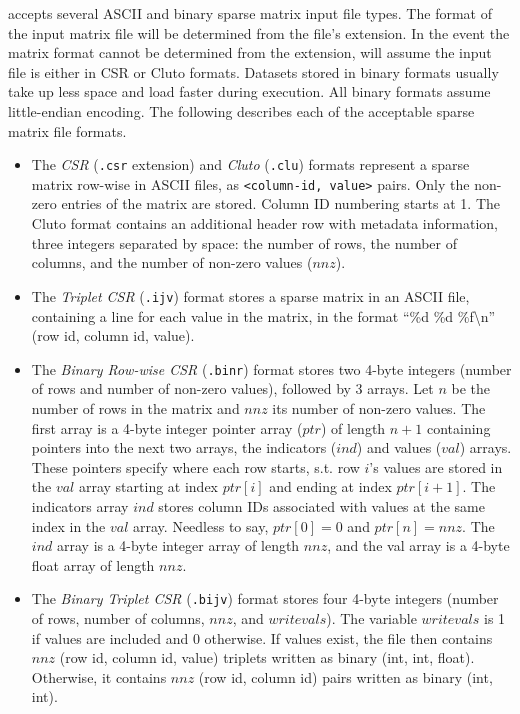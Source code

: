 \documentclass[]{article}
\begin{document}
\orion accepts several ASCII and binary sparse matrix input file types. The
format of the input matrix file will be determined from the file's extension. In
the event the matrix format cannot be determined from the extension, \orion will
assume the input file is either in CSR or Cluto formats. Datasets stored in
binary formats usually take up less space and load faster during
execution. All binary formats assume little-endian encoding. The following
describes each of the acceptable sparse matrix file formats.
\begin{itemize}
  \item The \emph{CSR} ({\tt.csr} extension) and \emph{Cluto} ({\tt.clu})
  formats represent a sparse matrix row-wise in ASCII files, as {\tt<column-id,
  value>} pairs. Only the non-zero entries of the matrix are stored. Column ID
  numbering starts at 1. The Cluto format contains an additional header row with
  metadata information, three integers separated by space: the number of rows,
  the number of columns, and the number of non-zero values ($nnz$).

  \item The \emph{Triplet CSR} ({\tt.ijv}) format stores a sparse matrix in an
  ASCII file, containing a line for each value in the matrix, in the format ``\%d \%d
  \%f\textbackslash{}n'' (row id, column id, value).

  \item The \emph{Binary Row-wise CSR} ({\tt.binr}) format stores two 4-byte
  integers (number of rows and number of non-zero values), followed by 3 arrays.
  Let $n$ be the number of rows in the matrix and $nnz$ its number of non-zero
  values. The first array is a 4-byte integer pointer array ($ptr$) of length
  $n+1$ containing pointers into the next two arrays, the indicators ($ind$) and
  values ($val$) arrays. These pointers specify where each row starts, s.t. row
  $i$'s values are stored in the $val$ array starting at index $ptr[i]$ and
  ending at index $ptr[i+1]$. The indicators array $ind$ stores column IDs
  associated with values at the same index in the $val$ array. Needless to say,
  $ptr[0] = 0$ and $ptr[n] = nnz$. The $ind$ array is a 4-byte integer array of
  length $nnz$, and the val array is a 4-byte float array of length $nnz$.

  \item The \emph{Binary Triplet CSR} ({\tt.bijv}) format stores four 4-byte
  integers (number of rows, number of columns, $nnz$, and $writevals$).
  The variable $writevals$ is 1 if values are included and 0 otherwise. If
  values exist, the file then contains $nnz$ (row id, column id, value) triplets
  written as binary (int, int, float).   Otherwise, it contains $nnz$ (row id,
  column id) pairs written as binary (int, int).
\end{itemize}
\end{document}
